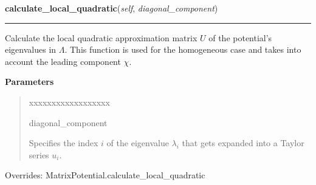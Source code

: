     \vspace{0.5ex}

\hspace{.8\funcindent}\begin{boxedminipage}{\funcwidth}

    \raggedright \textbf{calculate\_local\_quadratic}(\textit{self}, \textit{diagonal\_component})

    \vspace{-1.5ex}

    \rule{\textwidth}{0.5\fboxrule}
\setlength{\parskip}{2ex}
    Calculate the local quadratic approximation matrix $U$ of the
    potential's eigenvalues in $\Lambda$. This function is
    used for the homogeneous case and takes into account the leading
    component $\chi$.

\setlength{\parskip}{1ex}
      \textbf{Parameters}
      \vspace{-1ex}

      \begin{quote}
        \begin{Ventry}{xxxxxxxxxxxxxxxxxx}

          \item[diagonal\_component]

          Specifies the index $i$ of the eigenvalue
          $\lambda_i$ that gets expanded into a Taylor
          series $u_i$.

        \end{Ventry}

      \end{quote}



      Overrides: MatrixPotential.calculate\_local\_quadratic

    \end{boxedminipage}

    \vspace{0.5ex}

